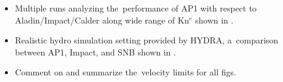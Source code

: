 \begin{itemize}
  \item Multiple runs analyzing the~performance of AP1 with respect to 
    Aladin/Impact/Calder along wide range of Kn$^e$ shown in 
    .
  \item Realistic hydro simulation setting provided by HYDRA, a~comparison
    between AP1, Impact, and SNB shown in .
  \item Comment on and summarize the~velocity limits for all figs.
\end{itemize}

